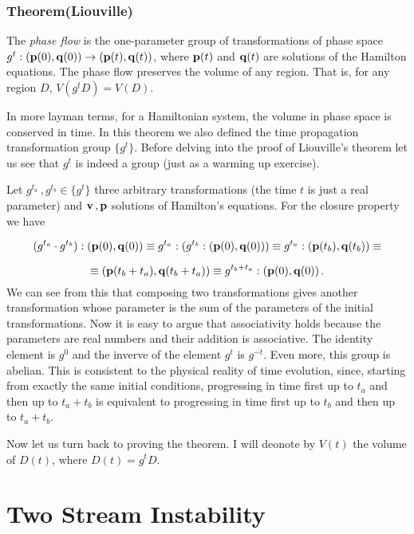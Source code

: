 \documentclass[12pt, class=report, crop=false]{standalone}
\begin{document}
\subsubsection{Theorem(Liouville)}
  The \textit{phase flow} is the one-parameter group of transformations of phase space
  \(g^t:(\vb{p}(0),\vb{q}(0))\rightarrow(\vb{p}(t),\vb{q}(t))\), where \(\vb{p}(t)\) and \(\vb{q}(t)\) are solutions of the Hamilton equations. The phase flow preserves the volume of any region. That is, for any region \(D\), \(V(g^tD)=V(D)\).
\newline

In more layman terms, for a Hamiltonian system, the volume in phase space is conserved in time. In this theorem we also defined the time propagation transformation group \(\{g^t\}\). Before delving into the proof of Liouville's theorem let us see that \({g^t}\) is indeed a group (just as a warming up exercise).

Let \(g^{t_a}\,,g^{t_b}\in \{g^t\}\) three arbitrary transformations (the time \(t\) is just a real parameter) and \(\vb{v}\,,\vb{p}\) solutions of Hamilton's equations. For the closure property we have

\begin{equation*}
  (g^{t_a}\cdot g^{t_b}):(\vb{p}(0),\vb{q}(0)) \equiv g^{t_a}:(g^{t_b}:(\vb{p}(0),\vb{q}(0))) \equiv g^{t_a}:(\vb{p}(t_b),\vb{q}(t_b)) \equiv
\end{equation*}

\begin{equation*}
  \equiv (\vb{p}(t_b+t_a),\vb{q}(t_b+t_a)) \equiv g^{t_b+t_a}:(\vb{p}(0),\vb{q}(0))\,.
\end{equation*}
We can see from this that composing two transformations gives another transformation whose parameter is the sum of the parameters of the initial transformations. Now it is easy to argue that associativity holds because the parameters are real numbers and their addition is associative. The identity element is \(g^0\) and the inverve of the element \(g^t\) is \(g^{-t}\). Even more, this group is abelian. This is consistent to the physical reality of time evolution, since, starting from exactly the same initial conditions, progressing in time first up to \(t_a\) and then up to \(t_a+t_b\) is equivalent to progressing in time first up to \(t_b\) and then up to \(t_a+t_b\).

Now let us turn back to proving the theorem. I will deonote by \(V(t)\) the volume of \(D(t)\), where \(D(t) = g^t D\).



\section{Two Stream Instability}
\end{document}
